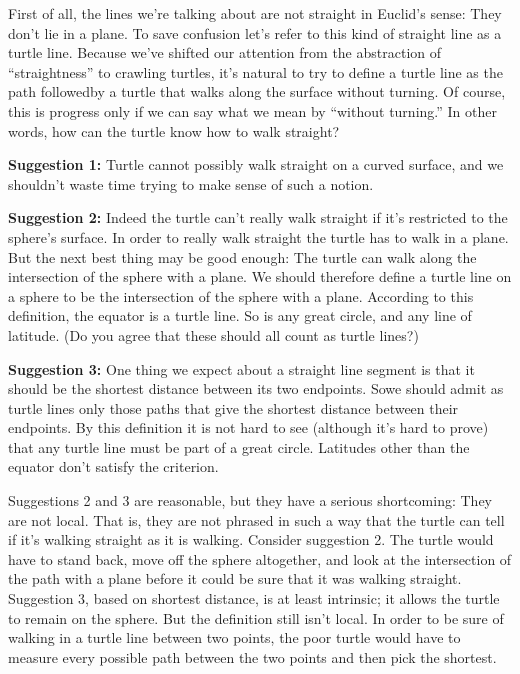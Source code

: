 \documentclass{book}
\begin{document}
First of all, the lines we're talking about are not straight in Euclid's
sense: They don't lie in a plane. To save confusion let's refer to this
kind of straight line as a turtle line. Because we've shifted our attention
from the abstraction of ``straightness'' to crawling turtles, it's natural
to try to define a turtle line as the path followedby a turtle that walks
along the surface without turning. Of course, this is progress only if we
can say what we mean by ``without turning.'' In other words, how can
the turtle know how to walk straight?

\textbf{Suggestion 1:} Turtle cannot possibly walk straight on a curved surface,
and we shouldn't waste time trying to make sense of such a notion.

\textbf{Suggestion 2:} Indeed the turtle can't really walk straight if it's restricted
to the sphere's surface. In order to really walk straight the turtle has
to walk in a plane. But the next best thing may be good enough: The
turtle can walk along the intersection of the sphere with a plane. We
should therefore define a turtle line on a sphere to be the intersection
of the sphere with a plane. According to this definition, the equator is
a turtle line. So is any great circle, and any line of latitude. (Do you
agree that these should all count as turtle lines?)

\textbf{Suggestion 3:} One thing we expect about a straight line segment is that it
should be the shortest distance between its two endpoints. Sowe should
admit as turtle lines only those paths that give the shortest distance
between their endpoints. By this definition it is not hard to see (although
it's hard to prove) that any turtle line must be part of a great circle.
Latitudes other than the equator don't satisfy the criterion.

Suggestions 2 and 3 are reasonable, but they have a serious shortcoming: They are not local. That is, they are not phrased in such a way
that the turtle can tell if it's walking straight as it is walking. Consider
suggestion 2. The turtle would have to stand back, move off the sphere
altogether, and look at the intersection of the path with a plane before
it could be sure that it was walking straight. Suggestion 3, based on
shortest distance, is at least intrinsic; it allows the turtle to remain on
the sphere. But the definition still isn't local. In order to be sure of
walking in a turtle line between two points, the poor turtle would have
to measure every possible path between the two points and then pick
the shortest.
\end{document}
